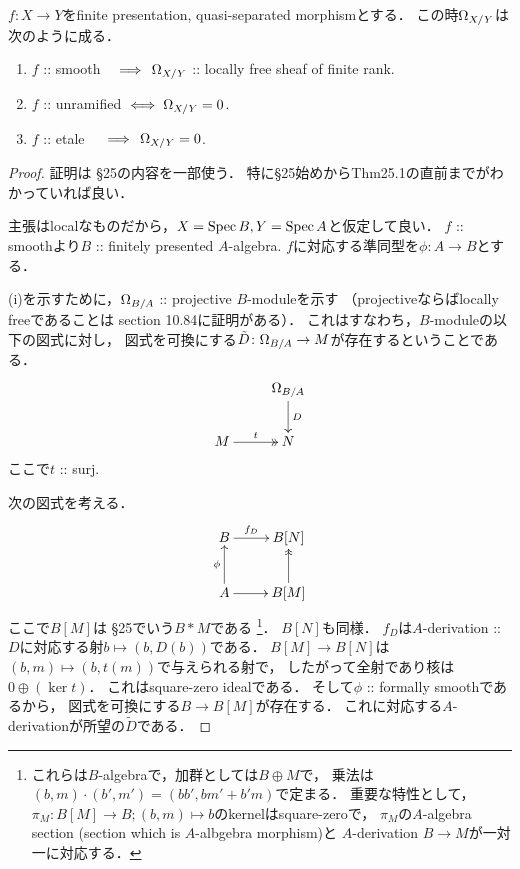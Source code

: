 \documentclass[a4paper, dvipdfmx]{jsarticle}
\begin{document}
\begin{Prop} \label{prop:dermod}
    $f \colon X \to Y$をfinite presentation, quasi-separated morphismとする．
    この時$\Omega_{X/Y}$は次のように成る．
\begin{enumerate}[label=(\roman*)]
    \item $f$ :: smooth \quad \ \,$\implies \,\Omega_{X/Y}$ :: locally free sheaf of finite rank.
    \item $f$ :: unramified $\iff \Omega_{X/Y}=0$.
    \item $f$ :: etale \qquad \ \ $\implies \, \Omega_{X/Y}=0$.
\end{enumerate}
\end{Prop}
\begin{proof}
    証明は\cite{Mat} \S 25の内容を一部使う．
    特に\S 25始めからThm25.1の直前までがわかっていれば良い．

    主張はlocalなものだから，$X=\operatorname{Spec} B, Y=\operatorname{Spec} A$と仮定して良い．
    $f$ :: smoothより$B$ :: finitely presented $A$-algebra.
    $f$に対応する準同型を$\phi \colon A \to B$とする．

    (i)を示すために，$\Omega_{B/A}$ :: projective $B$-moduleを示す
    （projectiveならばlocally freeであることは\cite{StacksProj} section 10.84に証明がある）．
    これはすなわち，$B$-moduleの以下の図式に対し，
    図式を可換にする$\tilde{D} \colon \Omega_{B/A} \to M$が存在するということである．
    \[\xymatrix{
        {} & \modDer_{B/A} \ar[d]^-{D}\\
        M \ar@{->>}[r]^-{t}& N
    }\]
    ここで$t$ :: surj.
    
    次の図式を考える．
    \[\xymatrix{
        B \ar[r]^-{f_D}& B[N] \\
        A \ar[r]\ar[u]^-{\phi}& B[M]\ar@{->>}[u]
    }\]
    ここで$B[M]$は\cite{Mat} \S 25でいう$B \ast M$である
    \footnote
    {
        これらは$B$-algebraで，加群としては$B \oplus M$で，
        乗法は$(b, m) \cdot (b', m')=(bb', bm'+b'm)$で定まる．
        重要な特性として，$\pi_M: B[M] \to B; (b, m) \mapsto b$のkernelはsquare-zeroで，
        $\pi_M$の$A$-algebra section (section which is $A$-albgebra morphism)と
        $A$-derivation $B \to M$が一対一に対応する．
    }．
    $B[N]$も同様．
    $f_D$は$A$-derivation :: $D$に対応する射$b \mapsto (b, D(b))$である．
    $B[M] \to B[N]$は$(b, m) \mapsto (b, t(m))$で与えられる射で，
    したがって全射であり核は$0 \oplus (\ker t)$．
    これはsquare-zero idealである．
    そして$\phi$ :: formally smoothであるから，
    図式を可換にする$B \to B[M]$が存在する．
    これに対応する$A$-derivationが所望の$\tilde{D}$である．


\end{proof}
\end{document}
